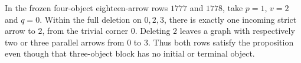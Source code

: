 \begin{remark*}
In the frozen four-object eighteen-arrow rows $1777$ and
$1778$, take $p=1$, $v=2$ and $q=0$. Within the full
deletion on $0,2,3$, there is exactly one incoming strict
arrow to $2$, from the trivial corner $0$. Deleting $2$
leaves a graph with respectively two or three parallel
arrows from $0$ to $3$. Thus both rows satisfy the proposition
even though that three-object block has no initial or
terminal object.
\end{remark*}
